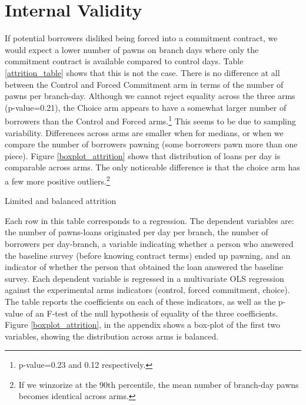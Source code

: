 \newpage
\section{ Internal Validity}

If potential borrowers disliked being forced into a commitment contract, we would expect a lower number of pawns on branch days where only the commitment contract is available compared to control days. Table \ref{attrition_table} shows that this is not the case. There is no difference at all between the Control and Forced Commitment arm in terms of the number of pawns per branch-day. Although we cannot reject equality across the three arms (p-value=0.21), the Choice arm appears to have a somewhat larger number of borrowers than the Control and Forced arms.\footnote{p-value=0.23 and 0.12 respectively.} This seems to be due to sampling variability. Differences across arms are smaller when for medians, or when we compare the number of borrowers pawning (some borrowers pawn more than one piece). Figure \ref{boxplot_attrition} shows that distribution of loans per day is comparable across arms. The only noticeable difference is that the choice arm has a few more positive outliers.\footnote{If we winzorize at the 90th percentile, the mean number of branch-day pawns becomes identical across arms.}

\begin{table}
\caption{Limited and balanced attrition}
\label{attrition_table}
\begin{center}
\scriptsize{}
\end{center}
\scriptsize{Each row in this table 
 corresponds to a regression. The dependent variables are: the number of pawns-loans originated per day per branch, the number of borrowers per day-branch, a variable indicating whether a person who answered the baseline survey (before knowing contract terms) ended up pawning, and an indicator of whether the person that obtained the loan answered the baseline survey. Each dependent variable is regressed in a multivariate OLS regression against the experimental arms indicators (control, forced commitment, choice). The table reports the coefficients on each of these indicators, as well as the p-value of an F-test of the null hypothesis of equality of the three coefficients. Figure \ref{boxplot_attrition}, in the appendix shows a box-plot of the first two variables, showing the distribution across arms is balanced.}
\end{table}


